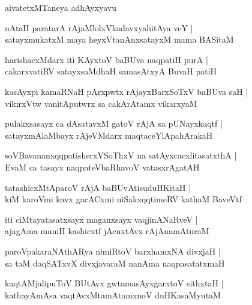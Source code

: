 \documentclass[twoside,12pt,openright]{book}
\newcounter{shloka}[chapter]
\begin{document}
\begin{center} 
aivatetxMTaneya adhAyxyavu 
\end{center}

\begin{shloka}%
nAtaH paratarA rAjaMlolxVkadavxyahitAya veY |\\
satayxmukatxM maya heyxVtanAnxsatayxM mama BASitaM 
\end{shloka}

\begin{shloka}%
harishacxMdarx iti KAyxtoV baBUva naqpatiH purA |\\
cakarxvatiRV satayxsaMdhaH samasAtxyA BuvaH patiH
\end{shloka}

\begin{shloka}%
kasAyxpi kamaRNaH pArxpwtx rAjayxBarxSoTxV baBUva saH |\\
vikirxVtw vanitAputwrx sa cakArAtamx vikarxyaM
\end{shloka}

\begin{shloka}%
pulakxsasayx ca dAsatavxM gatoV rAjA sa pUNayxkaqtf |\\
satayxmAlaMbayx rAjeVMdarx maqtaceYlApahArakaH 
\end{shloka}

\begin{shloka}%
soVBavananxqqpatisherxVSoThxV na satAyxcacxlitasatxthA |\\
EvaM ca tasayx naqpateVbaRhavoV vatasxrAgatAH
\end{shloka}

\begin{shloka}%
tatashicxMtAparoV rAjA baBUvAtisuduHKitaH |\\
kiM karoVmi kavx gacACxmi niSakxqqtimeRV kathaM BaveVtf 
\end{shloka}

\begin{shloka}%
iti ciMtayatasatxsayx maganxsayx vaqjinANaRveV |\\
ajagAma muniH kashicxtf jAcnxtAvx rAjAnamAturaM 
\end{shloka}

\begin{shloka}%
paroVpakaraNAthARya nimiRtoV barxhamxNA divxjaH |\\
sa taM daqSATxvX divxjavaraM nanAma naqpasatatxmaH 
\end{shloka}

\begin{shloka}%
kaqtAMjalipuToV BUtAvx gwtamasAyxgarxtoV sithxtaH |\\
kathayAmAsa vaqtAvxMtamAtamxnoV duHKasaMyutaM 
\end{shloka}
\end{document}
